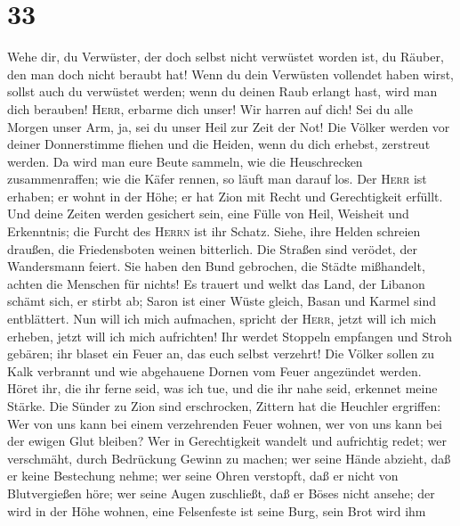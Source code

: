 \hypertarget{section-32}{%
\section{33}\label{section-32}}

 Wehe dir, du Verwüster, der doch selbst nicht verwüstet
worden ist, du Räuber, den man doch nicht beraubt hat! Wenn du dein
Verwüsten vollendet haben wirst, sollst auch du verwüstet werden; wenn
du deinen Raub erlangt hast, wird man dich berauben! 
\textsc{Herr}, erbarme dich unser! Wir harren auf dich! Sei du alle
Morgen unser Arm, ja, sei du unser Heil zur Zeit der Not! 
Die Völker werden vor deiner Donnerstimme fliehen und die Heiden, wenn
du dich erhebst, zerstreut werden.  Da wird man eure Beute
sammeln, wie die Heuschrecken zusammenraffen; wie die Käfer rennen, so
läuft man darauf los.  Der \textsc{Herr} ist erhaben; er
wohnt in der Höhe; er hat Zion mit Recht und Gerechtigkeit erfüllt.
 Und deine Zeiten werden gesichert sein, eine Fülle von
Heil, Weisheit und Erkenntnis; die Furcht des \textsc{Herrn} ist ihr
Schatz.  Siehe, ihre Helden schreien draußen, die
Friedensboten weinen bitterlich.  Die Straßen sind
verödet, der Wandersmann feiert. Sie haben den Bund gebrochen, die
Städte mißhandelt, achten die Menschen für nichts!  Es
trauert und welkt das Land, der Libanon schämt sich, er stirbt ab; Saron
ist einer Wüste gleich, Basan und Karmel sind entblättert.
 Nun will ich mich aufmachen, spricht der \textsc{Herr},
jetzt will ich mich erheben, jetzt will ich mich aufrichten!
 Ihr werdet Stoppeln empfangen und Stroh gebären; ihr
blaset ein Feuer an, das euch selbst verzehrt!  Die
Völker sollen zu Kalk verbrannt und wie abgehauene Dornen vom Feuer
angezündet werden.  Höret ihr, die ihr ferne seid, was
ich tue, und die ihr nahe seid, erkennet meine Stärke. 
Die Sünder zu Zion sind erschrocken, Zittern hat die Heuchler ergriffen:
Wer von uns kann bei einem verzehrenden Feuer wohnen, wer von uns kann
bei der ewigen Glut bleiben?  Wer in Gerechtigkeit
wandelt und aufrichtig redet; wer verschmäht, durch Bedrückung Gewinn zu
machen; wer seine Hände abzieht, daß er keine Bestechung nehme; wer
seine Ohren verstopft, daß er nicht von Blutvergießen höre; wer seine
Augen zuschließt, daß er Böses nicht ansehe;  der wird in
der Höhe wohnen, eine Felsenfeste ist seine Burg, sein Brot wird ihm
